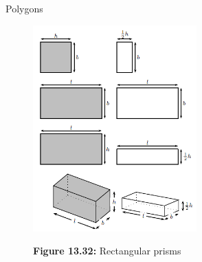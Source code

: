 \begin{exercises}{Polygons}
	\begin{figure}[H] %
    \begin{center}
    \label{m39357*id63644234!!!underscore!!!media}\label{m39357*id63644234!!!underscore!!!printimage}\includegraphics[height=300px]{col11306.imgs/m39357_MG10C14_008.png} %
        
      \vspace{2pt}
    \vspace{\rubberspace}\par \begin{cnxcaption}
	  \small \textbf{Figure 13.32: }Rectangular prisms
	\end{cnxcaption}
      
    \vspace{.1in}
    
    \end{center}

 \end{figure}   

    \addtocounter{footnote}{-0}
    \par 
 
    
          \begin{table}[H]
        
    
        \begin{center}
      
      \label{m39357*eip-742}
      
    \noindent
      \tablelasttail{}
      \begin{xtabular}[t]{|l|l|}\hline
    

\end{xtabular}
\end{center}
\end{table}
\end{exercises}
